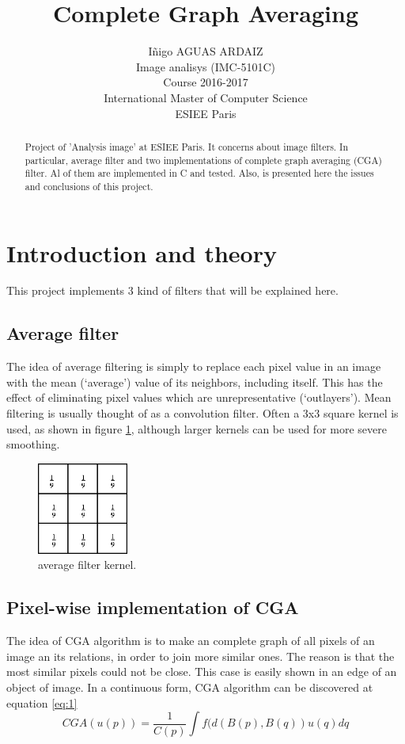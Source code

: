 \documentclass[a4paper,11pt,final]{article}
\title{Complete Graph Averaging}
\author{I\~nigo AGUAS ARDAIZ\\[10mm]Image analisys (IMC-5101C) \\Course 2016-2017\\International Master of Computer Science\\ ESIEE Paris\\[10mm]}
\begin{document}
\maketitle

\begin{abstract}
Project of 'Analysis image' at ESIEE Paris. It concerns about image filters. In particular, average filter and two implementations of complete graph averaging (CGA) filter. Al of them are implemented in C  and tested. Also, is presented here the issues and conclusions of this project.
\end{abstract}

\tableofcontents

\section{Introduction and theory}
This project implements 3 kind of filters that will be explained here. 

\subsection{Average filter}
The idea of average filtering is simply to replace each pixel value in an image with the mean (`average') value of its neighbors, including itself. This has the effect of eliminating pixel values which are unrepresentative (`outlayers'). Mean filtering is usually thought of as a convolution filter. Often a 3x3 square kernel is used, as shown in figure \ref{filtro}, although larger kernels can be used for more severe smoothing.

\begin{figure}[h!]
\begin{center}
\includegraphics[width=3cm]{img/mean.png}
\caption{average filter kernel.}\label{filtro}
\end{center}
\end{figure}

\subsection{Pixel-wise implementation of CGA}
The idea of CGA algorithm is to make an complete graph of all pixels of an image an its relations, in order to join more similar ones. The reason is that the most similar pixels could not be close. This case is easily shown in an edge of an object of image.    
In a continuous form, CGA algorithm can be discovered at equation \ref{eq:1}
\begin{equation}
CGA (u(p)) = \frac{1}{C(p)} \int{f(d(B(p),B(q))u(q)dq}
\label{eq:1}
\end{equation}
\end{document}
